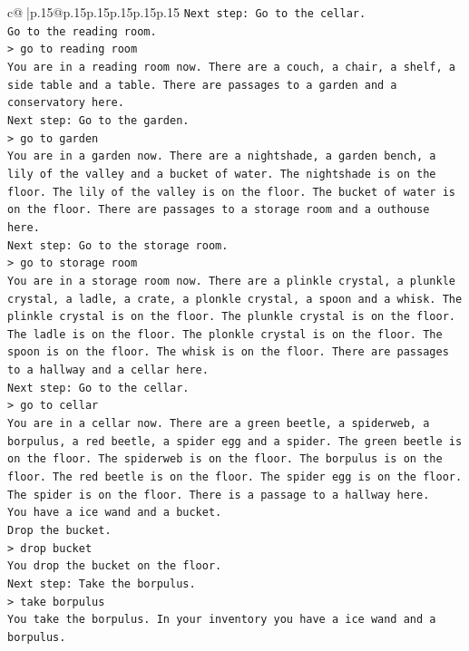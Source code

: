\documentclass{article}
\begin{document}
{\begin{supertabular}{c@{$\;$}|p{.15\linewidth}@{}p{.15\linewidth}p{.15\linewidth}p{.15\linewidth}p{.15\linewidth}p{.15\linewidth}}
{{{\texttt{Next step: Go to the cellar.} \\
\texttt{Go to the reading room.} \\
\texttt{> go to reading room} \\
\texttt{You are in a reading room now. There are a couch, a chair, a shelf, a side table and a table. There are passages to a garden and a conservatory here.} \\
\texttt{Next step: Go to the garden.} \\
\texttt{> go to garden} \\
\texttt{You are in a garden now. There are a nightshade, a garden bench, a lily of the valley and a bucket of water. The nightshade is on the floor. The lily of the valley is on the floor. The bucket of water is on the floor. There are passages to a storage room and a outhouse here.} \\
\texttt{Next step: Go to the storage room.} \\
\texttt{> go to storage room} \\
\texttt{You are in a storage room now. There are a plinkle crystal, a plunkle crystal, a ladle, a crate, a plonkle crystal, a spoon and a whisk. The plinkle crystal is on the floor. The plunkle crystal is on the floor. The ladle is on the floor. The plonkle crystal is on the floor. The spoon is on the floor. The whisk is on the floor. There are passages to a hallway and a cellar here.} \\
\texttt{Next step: Go to the cellar.} \\
\texttt{> go to cellar} \\
\texttt{You are in a cellar now. There are a green beetle, a spiderweb, a borpulus, a red beetle, a spider egg and a spider. The green beetle is on the floor. The spiderweb is on the floor. The borpulus is on the floor. The red beetle is on the floor. The spider egg is on the floor. The spider is on the floor. There is a passage to a hallway here.} \\
\texttt{You have a ice wand and a bucket.} \\
\texttt{Drop the bucket.} \\
\texttt{> drop bucket} \\
\texttt{You drop the bucket on the floor.} \\
\texttt{Next step: Take the borpulus.} \\
\texttt{> take borpulus} \\
\texttt{You take the borpulus. In your inventory you have a ice wand and a borpulus.} \\
}}}
\end{supertabular}}
\end{document}
